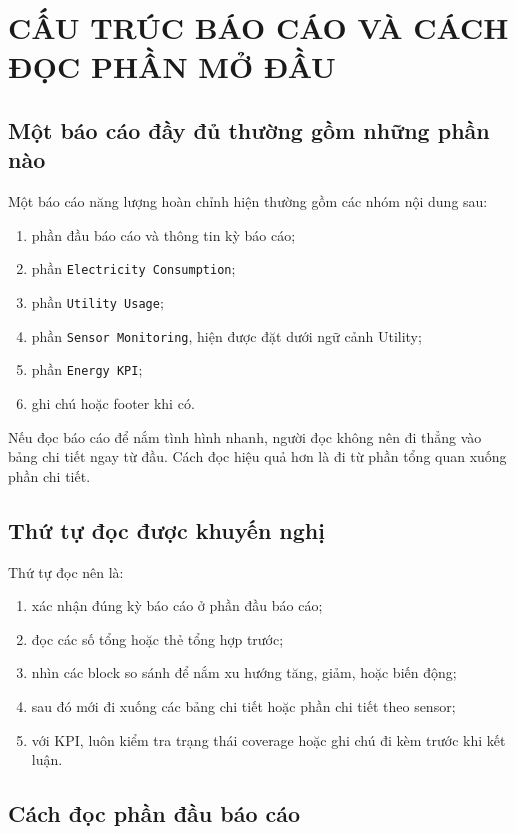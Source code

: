 \chapter{CẤU TRÚC BÁO CÁO VÀ CÁCH ĐỌC PHẦN MỞ ĐẦU}

\section{Một báo cáo đầy đủ thường gồm những phần nào}

Một báo cáo năng lượng hoàn chỉnh hiện thường gồm các nhóm nội dung sau:

\begin{enumerate}[label=-]
\item phần đầu báo cáo và thông tin kỳ báo cáo;
\item phần \texttt{Electricity Consumption};
\item phần \texttt{Utility Usage};
\item phần \texttt{Sensor Monitoring}, hiện được đặt dưới ngữ cảnh Utility;
\item phần \texttt{Energy KPI};
\item ghi chú hoặc footer khi có.
\end{enumerate}

Nếu đọc báo cáo để nắm tình hình nhanh, người đọc không nên đi thẳng vào bảng chi tiết ngay từ đầu. Cách đọc hiệu quả hơn là đi từ phần tổng quan xuống phần chi tiết.

\section{Thứ tự đọc được khuyến nghị}

Thứ tự đọc nên là:

\begin{enumerate}[label=-]
\item xác nhận đúng kỳ báo cáo ở phần đầu báo cáo;
\item đọc các số tổng hoặc thẻ tổng hợp trước;
\item nhìn các block so sánh để nắm xu hướng tăng, giảm, hoặc biến động;
\item sau đó mới đi xuống các bảng chi tiết hoặc phần chi tiết theo sensor;
\item với KPI, luôn kiểm tra trạng thái coverage hoặc ghi chú đi kèm trước khi kết luận.
\end{enumerate}

\section{Cách đọc phần đầu báo cáo}

